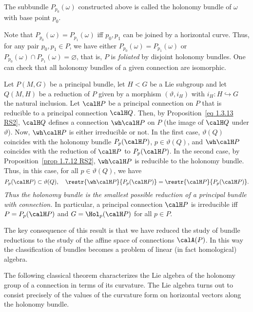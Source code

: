 \begin{defn}
    The subbundle $P_{p_0}(\omega)$ constructed above is called the holonomy bundle of $\omega$ with base point $p_0$.
\end{defn}

Note that $P_{p_0}(\omega)=P_{p_1}(\omega)$ iff $p_0,p_1$ can be joined by a horizontal curve. Thus, for any pair $p_0,p_1\in P$, we have either $P_{p_0}(\omega)=P_{p_1}(\omega)$ or $P_{p_0}(\omega)\cap P_{p_1}(\omega)=\varnothing$, that is, $P$ is \emph{foliated} by disjoint holonomy bundles. One can check that all holonomy bundles of a given connection are isomorphic.

\begin{rem}\label{rem 1.7.14 RS2}
    Let $P(M,G)$ be a principal bundle, let $H<G$ be a Lie subgroup and let $Q(M,H)$ be a reduction of $P$ given by a morphism $(\vartheta,i_H)$ with $i_H:H\hookrightarrow G$ the natural inclusion. Let $\calH P$ be a principal connection on $P$ that is reducible to a principal connection $\calH Q$. Then, by Proposition~\ref{eq 1.3.13 RS2}, $\calH Q$ defines a connection $\wh\calH P$ on $P$ (the image of $\calH Q$ under $\vartheta$). Now, $\wh\calH P$ is either irreducible or not. In the first case, $\vartheta(Q)$ coincides with the holonomy bundle $P_p(\calH P)$, $p\in\vartheta(Q)$, and $\wh\calH P$ coincides with the reduction of $\calH P$ to $P_p(\calH P)$. In the second case, by Proposition~\ref{prop 1.7.12 RS2}, $\wh\calH P$ is reducible to the holonomy bundle. Thus, in this case, for all $p\in\vartheta(Q)$, we have
    \[P_p(\calH P)\subset\vartheta(Q),\quad \restr{\wh\calH P}{P_p(\calH P)}=\restr{\calH P}{P_p(\calH P)}.\]
    \emph{Thus the holonomy bundle is the smallest possible reduction of a principal bundle with connection.} In particular, a principal connection $\calH P$ is irreducible iff $P=P_p(\calH P)$ and $G=\Hol_p(\calH P)$ for all $p\in P$.

    The key consequence of this result is that we have reduced the study of bundle reductions to the study of the affine space of connections $\calA(P)$. In this way the classification of bundles becomes a problem of linear (in fact homological) algebra.
\end{rem} 

The following classical theorem characterizes the Lie algebra of the holonomy group of a connection in terms of its curvature. The Lie algebra turns out to consist precisely of the values of the curvature form on horizontal vectors along the holonomy bundle.

